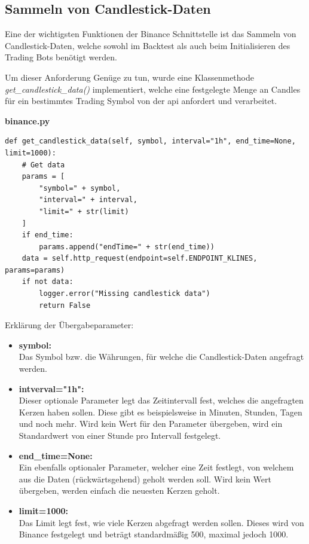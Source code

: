 \documentclass[oneside]{ausarbeitung}
\begin{document}
\subsection{Sammeln von Candlestick-Daten}
\label{sub:sammeln_von_candlestick_daten}

Eine der wichtigsten Funktionen der Binance Schnittstelle ist das Sammeln von Candlestick-Daten, welche sowohl im Backtest als auch beim Initialisieren des Trading Bots benötigt werden.

Um dieser Anforderung Genüge zu tun, wurde eine Klassenmethode \textit{get\_candlestick\_data()} implementiert, welche eine festgelegte Menge an Candles für ein bestimmtes Trading Symbol von der \ac{api} anfordert und verarbeitet.

\lstset{language=Python}
\lstset{frame=lines}
\lstset{basicstyle=\footnotesize}
\textbf{binance.py}
\begin{lstlisting}
def get_candlestick_data(self, symbol, interval="1h", end_time=None, limit=1000):
	# Get data
	params = [
		"symbol=" + symbol,
		"interval=" + interval,
		"limit=" + str(limit)
	]
	if end_time:
		params.append("endTime=" + str(end_time))
	data = self.http_request(endpoint=self.ENDPOINT_KLINES, params=params)
	if not data:
		logger.error("Missing candlestick data")
		return False
\end{lstlisting}

Erklärung der Übergabeparameter:
\begin{itemize}
	\item \textbf{symbol:} \\
		Das Symbol bzw. die Währungen, für welche die Candlestick-Daten angefragt
		werden.
	\item \textbf{intverval="1h":} \\
		Dieser optionale Parameter legt das Zeitintervall fest, welches die 
		angefragten Kerzen haben sollen. Diese gibt es beispielsweise in Minuten, 
		Stunden, Tagen und noch mehr. Wird kein Wert für den Parameter übergeben, 
		wird ein Standardwert von einer Stunde pro Intervall festgelegt.
	\item \textbf{end\_time=None:} \\
		Ein ebenfalls optionaler Parameter, welcher eine Zeit festlegt, von
		welchem aus die Daten (rückwärtsgehend) geholt werden soll. Wird kein
		Wert übergeben, werden einfach die neuesten Kerzen geholt.
	\item \textbf{limit=1000:} \\
		Das Limit legt fest, wie viele Kerzen abgefragt werden sollen. Dieses wird
		von Binance festgelegt und beträgt standardmäßig 500, maximal jedoch 1000.
\end{itemize}
\end{document}
